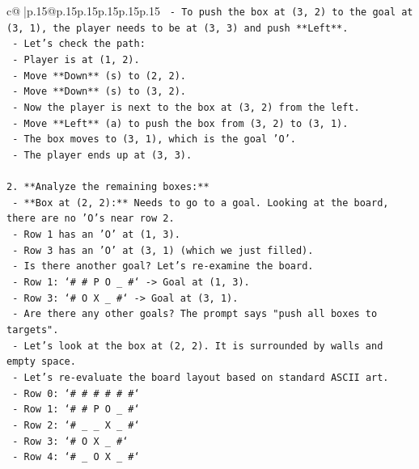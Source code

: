 \documentclass{article}
\begin{document}
{\begin{supertabular}{c@{$\;$}|p{.15\linewidth}@{}p{.15\linewidth}p{.15\linewidth}p{.15\linewidth}p{.15\linewidth}p{.15\linewidth}}
{{{\texttt{    {-} To push the box at (3, 2) to the goal at (3, 1), the player needs to be at (3, 3) and push **Left**.} \\
\texttt{    {-} Let's check the path:} \\
\texttt{      {-} Player is at (1, 2).} \\
\texttt{      {-} Move **Down** (s) to (2, 2).} \\
\texttt{      {-} Move **Down** (s) to (3, 2).} \\
\texttt{      {-} Now the player is next to the box at (3, 2) from the left.} \\
\texttt{      {-} Move **Left** (a) to push the box from (3, 2) to (3, 1).} \\
\texttt{      {-} The box moves to (3, 1), which is the goal 'O'.} \\
\texttt{      {-} The player ends up at (3, 3).} \\
\\ 
\texttt{2.  **Analyze the remaining boxes:**} \\
\texttt{    {-} **Box at (2, 2):** Needs to go to a goal. Looking at the board, there are no 'O's near row 2.} \\
\texttt{      {-} Row 1 has an 'O' at (1, 3).} \\
\texttt{      {-} Row 3 has an 'O' at (3, 1) (which we just filled).} \\
\texttt{      {-} Is there another goal? Let's re{-}examine the board.} \\
\texttt{      {-} Row 1: `\# \# P O \_ \#` {-}> Goal at (1, 3).} \\
\texttt{      {-} Row 3: `\# O X \_ \#` {-}> Goal at (3, 1).} \\
\texttt{      {-} Are there any other goals? The prompt says "push all boxes to targets".} \\
\texttt{      {-} Let's look at the box at (2, 2). It is surrounded by walls and empty space.} \\
\texttt{      {-} Let's re{-}evaluate the board layout based on standard ASCII art.} \\
\texttt{        {-} Row 0: `\# \# \# \# \# \#`} \\
\texttt{        {-} Row 1: `\# \# P O \_ \#`} \\
\texttt{        {-} Row 2: `\# \_ \_ X \_ \#`} \\
\texttt{        {-} Row 3: `\# O X \_ \#`} \\
\texttt{        {-} Row 4: `\# \_ O X \_ \#`} \\
}}}
\end{supertabular}}
\end{document}
